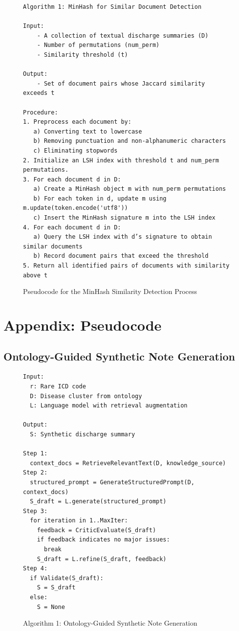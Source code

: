 \begin{figure}[H]
\centering
\begin{verbatim}
Algorithm 1: MinHash for Similar Document Detection

Input:
    - A collection of textual discharge summaries (D)
    - Number of permutations (num_perm)
    - Similarity threshold (t)

Output:
    - Set of document pairs whose Jaccard similarity exceeds t

Procedure:
1. Preprocess each document by:
   a) Converting text to lowercase
   b) Removing punctuation and non-alphanumeric characters
   c) Eliminating stopwords
2. Initialize an LSH index with threshold t and num_perm permutations.
3. For each document d in D:
   a) Create a MinHash object m with num_perm permutations
   b) For each token in d, update m using m.update(token.encode('utf8'))
   c) Insert the MinHash signature m into the LSH index
4. For each document d in D:
   a) Query the LSH index with d’s signature to obtain similar documents
   b) Record document pairs that exceed the threshold
5. Return all identified pairs of documents with similarity above t
\end{verbatim}
\caption{Pseudocode for the MinHash Similarity Detection Process}
\end{figure}



\chapter{Appendix: Pseudocode}

\section{Ontology-Guided Synthetic Note Generation}
\begin{figure}[H]
\centering
\caption{Algorithm 1: Ontology-Guided Synthetic Note Generation}
\label{fig:algo1}
\begin{verbatim}
Input:
  r: Rare ICD code
  D: Disease cluster from ontology
  L: Language model with retrieval augmentation

Output:
  S: Synthetic discharge summary

Step 1:
  context_docs = RetrieveRelevantText(D, knowledge_source)
Step 2:
  structured_prompt = GenerateStructuredPrompt(D, context_docs)
  S_draft = L.generate(structured_prompt)
Step 3:
  for iteration in 1..MaxIter:
    feedback = CriticEvaluate(S_draft)
    if feedback indicates no major issues:
      break
    S_draft = L.refine(S_draft, feedback)
Step 4:
  if Validate(S_draft):
    S = S_draft
  else:
    S = None
\end{verbatim}
\end{figure}

